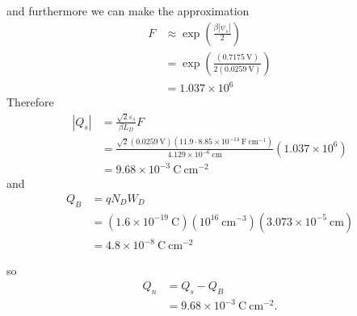 \documentclass{article}
\begin{document}
and furthermore we can make the approximation
\begin{align*}
F &\approx \exp \left(\frac{\beta|\psi_s|}{2}\right) \\
  &= \exp \left(\frac{(0.7175 ~\mathrm{V})}
                     {2(0.0259 ~\mathrm{V})}\right) \\
  &= 1.037 \times 10^{6} 
\end{align*}
Therefore
\begin{align*}
|Q_s| &= \frac{\sqrt{2}\varepsilon_s}{\beta L_D} F \\
      &= \frac{\sqrt{2}(0.0259 ~\mathrm{V})
                       (11.9 \cdot 8.85 \times 10^{-14} ~\mathrm{F}~\mathrm{cm}^{-1})}
              {4.129 \times 10^{-6} ~\mathrm{cm}}
         (1.037 \times 10^{6}) \\
      &= 9.68 \times 10^{-3} ~\mathrm{C}~\mathrm{cm}^{-2}
\end{align*}
and
\begin{align*}
Q_B &= qN_D W_D \\
    &= (1.6 \times 10^{-19} ~\mathrm{C})
       (10^{16} ~\mathrm{cm}^{-3})
       (3.073 \times 10^{-5} ~\mathrm{cm}) \\
    &= 4.8 \times 10^{-8} ~\mathrm{C}~\mathrm{cm}^{-2}
\end{align*}

so
\begin{align*}
Q_n &= Q_s - Q_B \\
    &= 9.68 \times 10^{-3} ~\mathrm{C}~\mathrm{cm}^{-2}.
\end{align*}

\pagebreak
\end{document}
